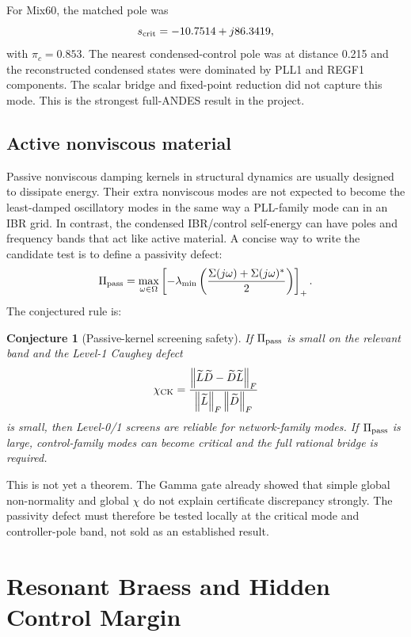 \documentclass[11pt]{article}
\newcommand{\norm}[1]{\left\lVert #1 \right\rVert}
\newcommand{\Lt}{\widetilde L}
\newcommand{\Dt}{\widetilde D}
\newtheorem{conjecture}{Conjecture}
\begin{document}
For Mix60, the matched pole was
\begin{equation}
  s_{\rm crit}=-10.7514+j86.3419,
  \label{eq:mix60-critical-pole}
\end{equation}
with $\pi_c=0.853$. The nearest condensed-control pole was at distance 0.215
and the reconstructed condensed states were dominated by PLL1 and REGF1
components. The scalar bridge and fixed-point reduction did not capture this
mode. This is the strongest full-ANDES result in the project.

\subsection{Active nonviscous material}

Passive nonviscous damping kernels in structural dynamics are usually designed
to dissipate energy. Their extra nonviscous modes are not expected to become
the least-damped oscillatory modes in the same way a PLL-family mode can in an
IBR grid. In contrast, the condensed IBR/control self-energy can have poles and
frequency bands that act like active material. A concise way to write the
candidate test is to define a passivity defect:
\begin{equation}
  \Pi_{\rm pass}
  =
  \max_{\omega\in\Omega}
  \left[-\lambda_{\min}\left(
  \frac{\Sigma(j\omega)+\Sigma(j\omega)^*}{2}
  \right)\right]_+ .
  \label{eq:passivity-defect}
\end{equation}
The conjectured rule is:

\begin{conjecture}[Passive-kernel screening safety]
If $\Pi_{\rm pass}$ is small on the relevant band and the Level-1 Caughey defect
\begin{equation}
  \chi_{\rm CK}=\frac{\norm{\Lt\Dt-\Dt\Lt}_F}{\norm{\Lt}_F\norm{\Dt}_F}
  \label{eq:caughey-defect}
\end{equation}
is small, then Level-0/1 screens are reliable for network-family modes. If
$\Pi_{\rm pass}$ is large, control-family modes can become critical and the
full rational bridge is required.
\end{conjecture}

This is not yet a theorem. The Gamma gate already showed that simple global
non-normality and global $\chi$ do not explain certificate discrepancy strongly.
The passivity defect must therefore be tested locally at the critical mode and
controller-pole band, not sold as an established result.

\section{Resonant Braess and Hidden Control Margin}
\end{document}
